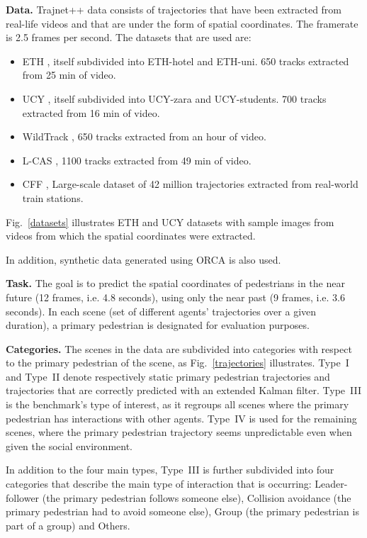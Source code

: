 \documentclass[conference]{IEEEtran}
\newcommand{\block}{\textbf}
\begin{document}
\block{Data.} Trajnet++ data consists of trajectories that have been extracted from real-life videos and that are under the form of spatial coordinates. The framerate is 2.5 frames per second.
The datasets that are used are:
\begin{itemize}
    \item ETH \cite{pellegrini2010improving}, itself subdivided into ETH-hotel and ETH-uni. 650 tracks extracted from 25 min of video.
    \item UCY \cite{leal2014learning}, itself subdivided into UCY-zara and UCY-students. 700 tracks extracted from 16 min of video.
    \item WildTrack \cite{chavdarova2018wildtrack}, 650 tracks extracted from an hour of video.
    \item L-CAS \cite{sun20183dof}, 1100 tracks extracted from 49 min of video.
    \item CFF \cite{alahi2014socially}, Large-scale dataset of 42 million trajectories extracted from real-world train stations.
\end{itemize}
Fig.~\ref{datasets} illustrates ETH and UCY datasets with sample images from videos from which the spatial coordinates were extracted.

In addition, synthetic data generated using ORCA \cite{orca} is also used.

\block{Task.} The goal is to predict the spatial coordinates of pedestrians in the near future (12 frames, i.e. 4.8 seconds), using only the near past (9 frames, i.e. 3.6 seconds). In each scene (set of different agents' trajectories over a given duration), a primary pedestrian is designated for evaluation purposes.
 
\block{Categories.} The scenes in the data are subdivided into categories with respect to the primary pedestrian of the scene, as Fig.~\ref{trajectories} illustrates. Type~I and Type~II denote respectively static primary pedestrian trajectories and trajectories that are correctly predicted with an extended Kalman filter. Type~III is the benchmark's type of interest, as it regroups all scenes where the primary pedestrian has interactions with other agents. Type~IV is used for the remaining scenes, where the primary pedestrian trajectory seems unpredictable even when given the social environment. 

In addition to the four main types, Type~III is further subdivided into four categories that describe the main type of interaction that is occurring: Leader-follower (the primary pedestrian follows someone else), Collision avoidance (the primary pedestrian had to avoid someone else), Group (the primary pedestrian is part of a group) and Others.
\end{document}
